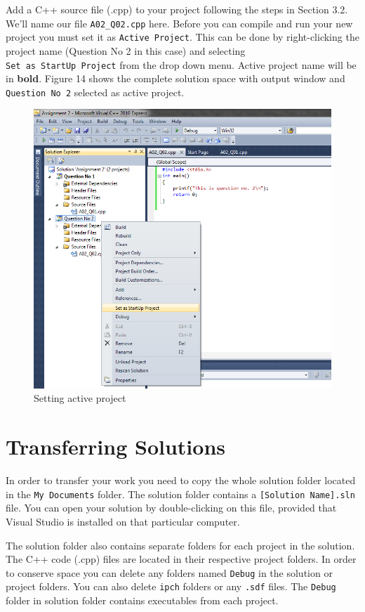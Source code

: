 \documentclass{article}
\begin{document}
Add a C++ source file (.cpp) to your project following the steps in Section 3.2. We'll name our file \verb|A02_Q02.cpp| here. Before you can compile and run your new project you must set it as \verb|Active Project|. This can be done by right-clicking the project name (Question No 2 in this case) and selecting\\ \verb|Set as StartUp Project| from the drop down menu. Active project name will be in \textbf{bold}. Figure 14 shows the complete solution space with output window and \verb|Question No 2| selected as active project.
\begin{figure}[H]
\centering
\includegraphics[scale=0.6]{Setting_Active_Project.png}
\caption{Setting active project}
\end{figure}

\section{Transferring Solutions}
In order to transfer your work you need to copy the whole solution folder located in the \verb|My Documents| folder. The solution folder contains a \verb|[Solution Name].sln| file. You can open your solution by double-clicking on this file, provided that Visual Studio is installed on that particular computer.

The solution folder also contains separate folders for each project in the solution. The C++ code (.cpp) files are located in their respective project folders. In order to conserve space you can delete any folders named \verb|Debug| in the solution or project folders. You can also delete \verb|ipch| folders or any \verb|.sdf| files. The \verb|Debug| folder in solution folder contains executables from each project.
\end{document}
